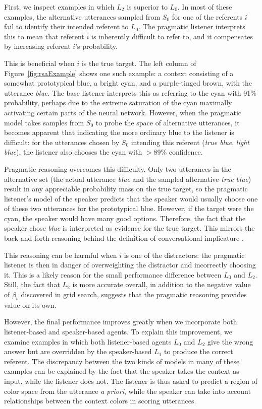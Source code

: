 \documentclass[11pt,letterpaper]{article}
\newcommand{\term}{\textit}
\newcommand{\Listener}{L}
\newcommand{\Speaker}{S}
\renewcommand{\|}{\mid}
\newcommand{\figref}[1]{Figure~\ref{#1}}
\begin{document}
First, we inspect examples in which $\Listener_2$ is superior to $\Listener_0$.
In most of these examples, the alternative utterances sampled from $\Speaker_0$
for one of the referents $i$ fail to identify
their intended referent to $\Listener_0$. The pragmatic listener interprets
this to mean that referent $i$ is inherently difficult to refer to,
and it compensates by increasing referent $i$'s probability.

This is beneficial when $i$ is the true target. The left column of 
\figref{fig:rsaExample} shows one such example:
a context consisting of a somewhat prototypical blue,
a bright cyan, and a purple-tinged brown, with the utterance \textit{blue}. The
base listener interprets this as referring to the cyan with 91\% probability,
perhaps due to the extreme saturation of the cyan maximally activating certain
parts of the neural network. However, when the pragmatic model takes samples
from $\Speaker_0$ to probe the space of alternative utterances, it becomes
apparent that indicating the more ordinary blue to the listener is difficult:
for the utterances chosen by $\Speaker_0$ intending this referent (\textit{true blue},
\textit{light blue}), the listener also
chooses the cyan with $>$89\% confidence.

Pragmatic reasoning overcomes this difficulty. Only two utterances in the
alternative set (the actual utterance \textit{blue} and the sampled alternative
\textit{true blue}) result in any appreciable probability mass on the true target,
so the pragmatic listener's model of the speaker predicts that the speaker
would usually choose one of these two utterances for the prototypical blue.
However, if the target
were the cyan, the speaker would have many good options. Therefore, the
fact that the speaker chose \textit{blue} is interpreted as evidence for the
true target. This mirrors the back-and-forth reasoning behind the
definition of conversational implicature \cite{Grice75}.

This reasoning can be harmful when $i$ is one of the distractors: the pragmatic
listener is then in danger of overweighting the distractor and incorrectly
choosing it. This is a likely reason for the small performance difference
between $\Listener_0$ and $\Listener_2$. Still, the fact that $\Listener_2$
is more accurate overall, in addition to the negative value of $\beta_b$
discovered in grid search, suggests that the pragmatic reasoning provides
value on its own.

However, the final performance improves greatly when we incorporate both
listener-based and speaker-based agents. To explain this improvement, we examine
examples in which both listener-based agents $\Listener_0$ and
$\Listener_2$ give the wrong answer but are overridden by the speaker-based
$\Listener_1$ to produce the correct referent. The discrepancy between the two
kinds of models in many of these examples can be explained by the fact that the
speaker takes the context as input, while the listener does not. The listener is
thus asked to predict a region of color space from the utterance \term{a priori},
while the speaker can take into account relationships between the context colors
in scoring utterances.
\end{document}
